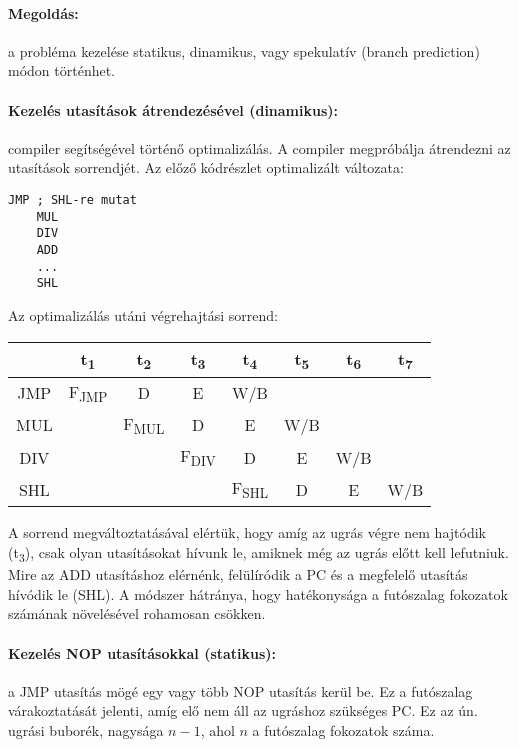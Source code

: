\paragraph{Megoldás:} a probléma kezelése statikus, dinamikus, vagy spekulatív (branch prediction) módon történhet.
\paragraph{Kezelés utasítások átrendezésével (dinamikus):} compiler segítségével történő optimalizálás. A compiler megpróbálja átrendezni az utasítások sorrendjét.
Az előző kódrészlet optimalizált változata:
\begin{lstlisting}[language=Ant]
    JMP ; SHL-re mutat
    MUL
    DIV
    ADD
    ...
    SHL
\end{lstlisting}
Az optimalizálás utáni végrehajtási sorrend:
\begin{center}
    \begin{tabular}{ c | c | c | c | c | c | c | c }
            & t\textsubscript{1}   & t\textsubscript{2}   & t\textsubscript{3}   & t\textsubscript{4}   & t\textsubscript{5} & t\textsubscript{6} & t\textsubscript{7} \\
        \hline
        JMP & F\textsubscript{JMP} & D                    & E                    & W/B                  &                    &                                         \\
        \hline
        MUL &                      & F\textsubscript{MUL} & D                    & E                    & W/B                                                          \\
        \hline
        DIV &                      &                      & F\textsubscript{DIV} & D                    & E                  & W/B                                     \\
        \hline
        SHL &                      &                      &                      & F\textsubscript{SHL} & D                  & E                  & W/B
    \end{tabular}
\end{center}
A sorrend megváltoztatásával elértük, hogy amíg az ugrás végre nem hajtódik (t\textsubscript{3}), csak olyan utasításokat hívunk le, amiknek még az ugrás előtt kell lefutniuk.
Mire az ADD utasításhoz elérnénk, felülíródik a PC és a megfelelő utasítás hívódik le (SHL).
A módszer hátránya, hogy hatékonysága a futószalag fokozatok számának növelésével rohamosan csökken.
\paragraph{Kezelés NOP utasításokkal (statikus):} a JMP utasítás mögé egy vagy több NOP utasítás kerül be.
Ez a futószalag várakoztatását jelenti, amíg elő nem áll az ugráshoz szükséges PC. Ez az ún. ugrási buborék, nagysága $n-1$, ahol $n$ a futószalag fokozatok száma.
